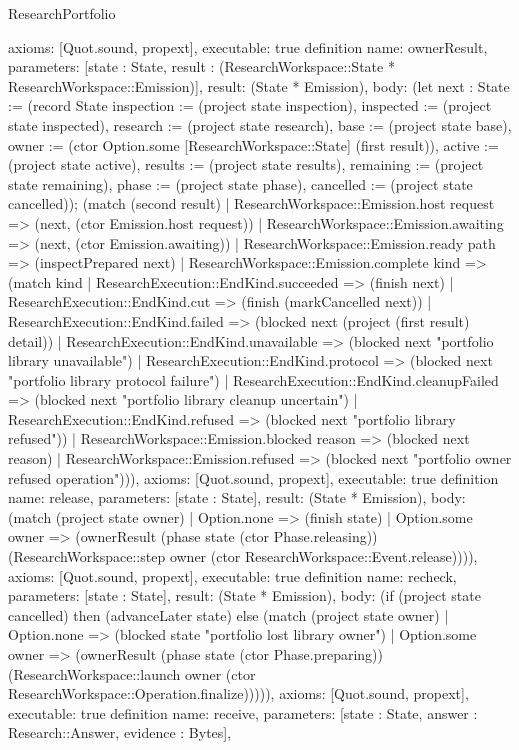 \begin{lexlean}{ResearchPortfolio}
\begin{semanticmodule}
{ axioms: [Quot.sound, propext],
 executable: true
}
definition{
 name: ownerResult,
 parameters: [state : State, result : (ResearchWorkspace::State * ResearchWorkspace::Emission)],
 result: (State * Emission),
 body: (let next : State := (record State {inspection := (project state inspection), inspected := (project state inspected), research := (project state research), base := (project state base), owner := (ctor Option.some [ResearchWorkspace::State] (first result)), active := (project state active), results := (project state results), remaining := (project state remaining), phase := (project state phase), cancelled := (project state cancelled)}); (match (second result) | ResearchWorkspace::Emission.host request => (next, (ctor Emission.host request)) | ResearchWorkspace::Emission.awaiting => (next, (ctor Emission.awaiting)) | ResearchWorkspace::Emission.ready path => (inspectPrepared next) | ResearchWorkspace::Emission.complete kind => (match kind | ResearchExecution::EndKind.succeeded => (finish next) | ResearchExecution::EndKind.cut => (finish (markCancelled next)) | ResearchExecution::EndKind.failed => (blocked next (project (first result) detail)) | ResearchExecution::EndKind.unavailable => (blocked next "portfolio library unavailable") | ResearchExecution::EndKind.protocol => (blocked next "portfolio library protocol failure") | ResearchExecution::EndKind.cleanupFailed => (blocked next "portfolio library cleanup uncertain") | ResearchExecution::EndKind.refused => (blocked next "portfolio library refused")) | ResearchWorkspace::Emission.blocked reason => (blocked next reason) | ResearchWorkspace::Emission.refused => (blocked next "portfolio owner refused operation"))),
 axioms: [Quot.sound, propext],
 executable: true
}
definition{
 name: release,
 parameters: [state : State],
 result: (State * Emission),
 body: (match (project state owner) | Option.none => (finish state) | Option.some owner => (ownerResult (phase state (ctor Phase.releasing)) (ResearchWorkspace::step owner (ctor ResearchWorkspace::Event.release)))),
 axioms: [Quot.sound, propext],
 executable: true
}
definition{
 name: recheck,
 parameters: [state : State],
 result: (State * Emission),
 body: (if (project state cancelled) then (advanceLater state) else (match (project state owner) | Option.none => (blocked state "portfolio lost library owner") | Option.some owner => (ownerResult (phase state (ctor Phase.preparing)) (ResearchWorkspace::launch owner (ctor ResearchWorkspace::Operation.finalize))))),
 axioms: [Quot.sound, propext],
 executable: true
}
definition{
 name: receive,
 parameters: [state : State, answer : Research::Answer, evidence : Bytes],
}
\end{semanticmodule}
\end{lexlean}
